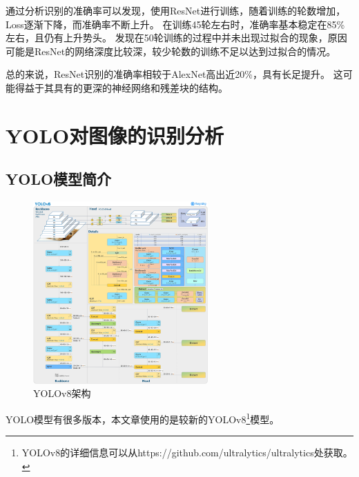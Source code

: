 \documentclass[UTF8]{ctexart}
\begin{document}
通过分析识别的准确率可以发现，使用ResNet进行训练，随着训练的轮数增加，Loss逐渐下降，而准确率不断上升。
在训练45轮左右时，准确率基本稳定在85\%左右，且仍有上升势头。
发现在50轮训练的过程中并未出现过拟合的现象，原因可能是ResNet的网络深度比较深，较少轮数的训练不足以达到过拟合的情况。 \par
总的来说，ResNet识别的准确率相较于AlexNet高出近20\%，具有长足提升。
这可能得益于其具有的更深的神经网络和残差块的结构。

\section{YOLO对图像的识别分析}

\subsection{YOLO模型简介}


\begin{figure}
    \centering %
    \includegraphics[height=7cm]{../YOLO/pics/img1.png}
    \caption{YOLOv8架构}
\end{figure}

YOLO模型有很多版本，本文章使用的是较新的YOLOv8\footnote{YOLOv8的详细信息可以从https://github.com/ultralytics/ultralytics处获取。}模型。
\end{document}

